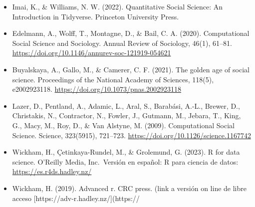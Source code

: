 \documentclass[11pt,letter,]{article}
\providecommand{\tightlist}{%
  \setlength{\itemsep}{0pt}\setlength{\parskip}{0pt}}
\begin{document}
\begin{itemize}
\tightlist
\item
  Imai, K., \& Williams, N. W. (2022). Quantitative Social Science: An
  Introduction in Tidyverse. Princeton University Press.
\item
  Edelmann, A., Wolff, T., Montagne, D., \& Bail, C. A. (2020).
  Computational Social Science and Sociology. Annual Review of
  Sociology, 46(1), 61--81.
  \url{https://doi.org/10.1146/annurev-soc-121919-054621}
\item
  Buyalskaya, A., Gallo, M., \& Camerer, C. F. (2021). The golden age of
  social science. Proceedings of the National Academy of Sciences,
  118(5), e2002923118. \url{https://doi.org/10.1073/pnas.2002923118}
\item
  Lazer, D., Pentland, A., Adamic, L., Aral, S., Barabási, A.-L.,
  Brewer, D., Christakis, N., Contractor, N., Fowler, J., Gutmann, M.,
  Jebara, T., King, G., Macy, M., Roy, D., \& Van Alstyne, M. (2009).
  Computational Social Science. Science, 323(5915), 721--723.
  \url{https://doi.org/10.1126/science.1167742}
\item
  Wickham, H., Çetinkaya-Rundel, M., \& Grolemund, G. (2023). R for data
  science. O'Reilly Media, Inc.~Versión en español: R para ciencia de
  datos: \url{https://es.r4ds.hadley.nz/}
\item
  Wickham, H. (2019). Advanced r. CRC press. (link a versión on line de
  libre acceso {[}https://adv-r.hadley.nz/{]}(https://
\end{itemize}
\end{document}
